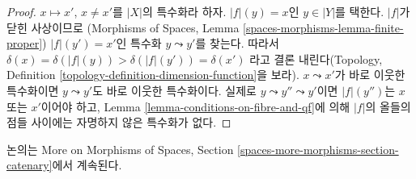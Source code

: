 \begin{proof}
$x \mapsto x'$, $x \not = x'$를 $|X|$의 특수화라 하자.
$|f|(y) = x$인 $y \in |Y|$를 택한다. $|f|$가 닫힌 사상이므로
(Morphisms of Spaces, Lemma \ref{spaces-morphisms-lemma-finite-proper})
$|f|(y') = x'$인 특수화 $y \leadsto y'$를 찾는다.
따라서
$\delta(x) = \delta(|f|(y)) > \delta(|f|(y')) = \delta(x')$
라고 결론 내린다(Topology, Definition
\ref{topology-definition-dimension-function}을 보라).
$x \leadsto x'$가 바로 이웃한 특수화이면
$y \leadsto y'$도 바로 이웃한 특수화이다. 실제로
$y \leadsto y'' \leadsto y'$이면 $|f|(y'')$는 $x$ 또는 $x'$이어야
하고, Lemma \ref{lemma-conditions-on-fibre-and-qf}에 의해 $|f|$의
올들의 점들 사이에는 자명하지 않은 특수화가 없다.
\end{proof}

\noindent
논의는 More on Morphisms of Spaces, Section
\ref{spaces-more-morphisms-section-catenary}에서 계속된다.















